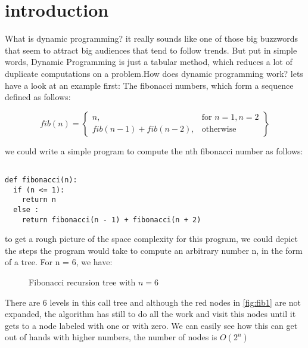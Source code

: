 
 
 \section{introduction}


What is dynamic programming? it really sounds like one of those big buzzwords that seem to
attract big audiences that tend to follow trends. But put in simple words, Dynamic Programming is just a tabular method, 
which reduces a lot of duplicate computations on a problem.How does dynamic programming work? lets have a look at an example first: The fibonacci numbers,
which form a sequence defined as follows:

  \[
    fib(n) = \left\{\begin{array}{lr}
      n, & \text{for } n = 1, n = 2\\
      fib(n-1) + fib(n-2), & \text{otherwise}
      \end{array}\right\}
  \]

we could write a simple program to compute the nth fibonacci number as follows:

\begin{verbatim}

def fibonacci(n):
  if (n <= 1):
    return n
  else :
    return fibonacci(n - 1) + fibonacci(n + 2)

\end{verbatim}


to get a rough picture of the space complexity for this program, we could depict the steps
the program would take to compute an arbitrary number n, in the form of a tree. For n = 6, we have:


\begin{figure}[ht]
  \centering
  \caption{Fibonacci recursion tree with $n = 6$}
  \label{fig:fib1}
\end{figure}

There are 6 levels in this call tree and although the red nodes in \autoref{fig:fib1} are 
not expanded, the algorithm has still to do all the work and visit this nodes until it gets to a node
labeled with one or with zero. We can easily see how this can get out of hands with higher numbers, the 
number of nodes is $O(2^n)$

